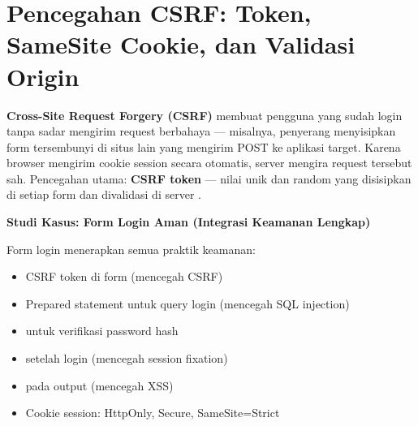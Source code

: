 \section{Pencegahan CSRF: Token, SameSite Cookie, dan Validasi Origin}

\textbf{Cross-Site Request Forgery (CSRF)} membuat pengguna yang sudah login tanpa sadar mengirim request berbahaya --- misalnya, penyerang menyisipkan form tersembunyi di situs lain yang mengirim POST ke aplikasi target. Karena browser mengirim cookie session secara otomatis, server mengira request tersebut sah. Pencegahan utama: \textbf{CSRF token} --- nilai unik dan random yang disisipkan di setiap form dan divalidasi di server \cite{owaspCsrf}.

\begin{contoh}
\textbf{Studi Kasus: Form Login Aman (Integrasi Keamanan Lengkap)}

Form login menerapkan semua praktik keamanan:
\begin{itemize}
  \item CSRF token di form (mencegah CSRF)
  \item Prepared statement untuk query login (mencegah SQL injection)
  \item {} untuk verifikasi password hash
  \item {} setelah login (mencegah session fixation)
  \item {} pada output (mencegah XSS)
  \item Cookie session: HttpOnly, Secure, SameSite=Strict
\end{itemize}
\end{contoh}


